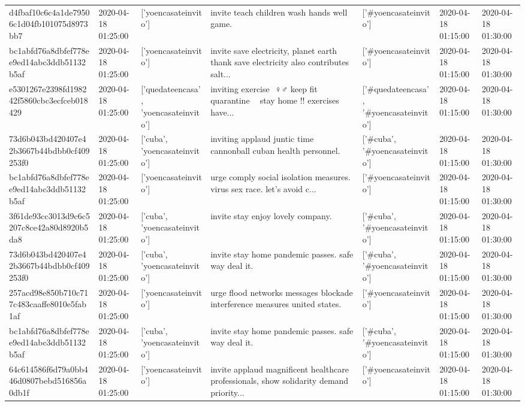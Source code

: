 \begin{tabular}{lllllll}
d4fbaf10c6c4a1de79506c1d04fb101075d8973bb7 & 2020-04-18 01:25:00 & ['yoencasateinvito'] & invite teach children wash hands well game. & ['#yoencasateinvito'] & 2020-04-18 01:15:00 & 2020-04-18 01:30:00 \\
bc1abfd76a8dbfef778ee9ed14abc3ddb51132b5af & 2020-04-18 01:25:00 & ['yoencasateinvito'] & invite save electricity, planet earth thank save electricity also contributes salt... & ['#yoencasateinvito'] & 2020-04-18 01:15:00 & 2020-04-18 01:30:00 \\
e5301267e2398fd198242f5860cbc3ecfceb018429 & 2020-04-18 01:25:00 & ['quedateencasa', 'yoencasateinvito'] & inviting exercise ️ ♀️♂️ keep fit quarantine 💪💪 stay home !!️ exercises have... & ['#quedateencasa', '#yoencasateinvito'] & 2020-04-18 01:15:00 & 2020-04-18 01:30:00 \\
73d6b043bd420407e42b3667b44bdbb0cf409253f0 & 2020-04-18 01:25:00 & ['cuba', 'yoencasateinvito'] & inviting applaud juntic time cannonball cuban health personnel. & ['#cuba', '#yoencasateinvito'] & 2020-04-18 01:15:00 & 2020-04-18 01:30:00 \\
bc1abfd76a8dbfef778ee9ed14abc3ddb51132b5af & 2020-04-18 01:25:00 & ['yoencasateinvito'] & urge comply social isolation measures. virus sex race. let's avoid c... & ['#yoencasateinvito'] & 2020-04-18 01:15:00 & 2020-04-18 01:30:00 \\
3f61de93cc3013d9c6c5207c8ce42a80d8920b5da8 & 2020-04-18 01:25:00 & ['cuba', 'yoencasateinvito'] & invite stay enjoy lovely company. & ['#cuba', '#yoencasateinvito'] & 2020-04-18 01:15:00 & 2020-04-18 01:30:00 \\
73d6b043bd420407e42b3667b44bdbb0cf409253f0 & 2020-04-18 01:25:00 & ['cuba', 'yoencasateinvito'] & invite stay home pandemic passes. safe way deal it. & ['#cuba', '#yoencasateinvito'] & 2020-04-18 01:15:00 & 2020-04-18 01:30:00 \\
257acd98e850b710c717c483caaffe8010e5fab1af & 2020-04-18 01:25:00 & ['yoencasateinvito'] & urge flood networks messages blockade interference measures united states. & ['#yoencasateinvito'] & 2020-04-18 01:15:00 & 2020-04-18 01:30:00 \\
bc1abfd76a8dbfef778ee9ed14abc3ddb51132b5af & 2020-04-18 01:25:00 & ['cuba', 'yoencasateinvito'] & invite stay home pandemic passes. safe way deal it. & ['#cuba', '#yoencasateinvito'] & 2020-04-18 01:15:00 & 2020-04-18 01:30:00 \\
64c614586f6d79a0bb446d0807bebd516856a0db1f & 2020-04-18 01:25:00 & ['yoencasateinvito'] & invite applaud magnificent healthcare professionals, show solidarity demand priority... & ['#yoencasateinvito'] & 2020-04-18 01:15:00 & 2020-04-18 01:30:00 \\

\end{tabular}
